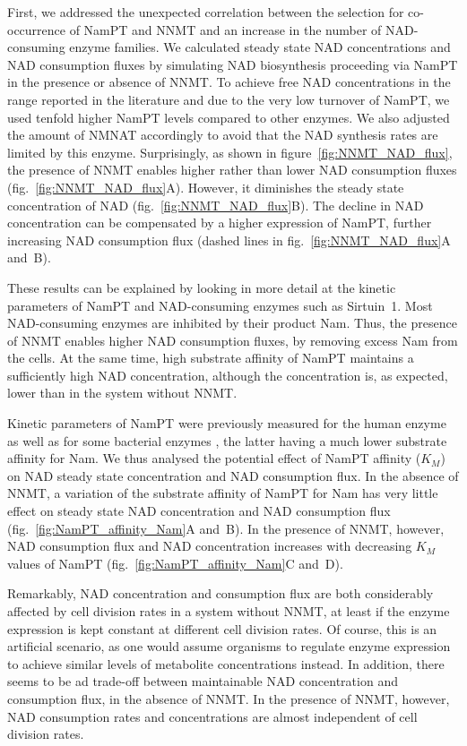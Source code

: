 First, we addressed the unexpected correlation between the selection for co-occurrence of NamPT and NNMT and an increase in the number of NAD-consuming enzyme families. We calculated steady state NAD concentrations and NAD consumption fluxes by simulating NAD biosynthesis proceeding via NamPT in the presence or absence of NNMT. To achieve free NAD concentrations in the range reported in the literature and due to the very low turnover of NamPT, we used tenfold higher NamPT levels compared to other enzymes. We also adjusted the amount of NMNAT accordingly to avoid that the NAD synthesis rates are limited by this enzyme. Surprisingly, as shown in figure~\ref{fig:NNMT_NAD_flux}, the presence of NNMT enables higher rather than lower NAD consumption fluxes (fig.~\ref{fig:NNMT_NAD_flux}A). However, it diminishes the steady state concentration of NAD (fig.~\ref{fig:NNMT_NAD_flux}B). The decline in NAD concentration can be compensated by a higher expression of NamPT, further increasing NAD consumption flux (dashed lines in fig.~\ref{fig:NNMT_NAD_flux}A and~B).

These results can be explained by looking in more detail at the kinetic parameters of NamPT and NAD-consuming enzymes such as Sirtuin~1. Most NAD-consuming enzymes are inhibited by their product Nam. Thus, the presence of NNMT enables higher NAD consumption fluxes, by removing excess Nam from the cells. At the same time, high substrate affinity of NamPT maintains a sufficiently high NAD concentration, although the concentration is, as expected, lower than in the system without NNMT.

Kinetic parameters of NamPT were previously measured for the human enzyme \cite{Burgos2008} as well as for some bacterial enzymes \cite{Sorci2010}, the latter having a much lower substrate affinity for Nam. We thus analysed the potential effect of NamPT affinity ($K_{M}$) on NAD steady state concentration and NAD consumption flux. In the absence of NNMT, a variation of the substrate affinity of NamPT for Nam has very little effect on steady state NAD concentration and NAD consumption flux (fig.~\ref{fig:NamPT_affinity_Nam}A and~B). In the presence of NNMT, however, NAD consumption flux and NAD concentration increases with decreasing $K_{M}$ values of NamPT (fig.~\ref{fig:NamPT_affinity_Nam}C and~D).

Remarkably, NAD concentration and consumption flux are both considerably affected by cell division rates in a system without NNMT, at least if the enzyme expression is kept constant at different cell division rates. Of course, this is an artificial scenario, as one would assume organisms to regulate enzyme expression to achieve similar levels of metabolite concentrations instead. 
In addition, there seems to be ad trade-off  between maintainable NAD concentration and consumption flux, in the absence of NNMT. In the presence of NNMT, however, NAD consumption rates and concentrations are almost independent of cell division rates.

